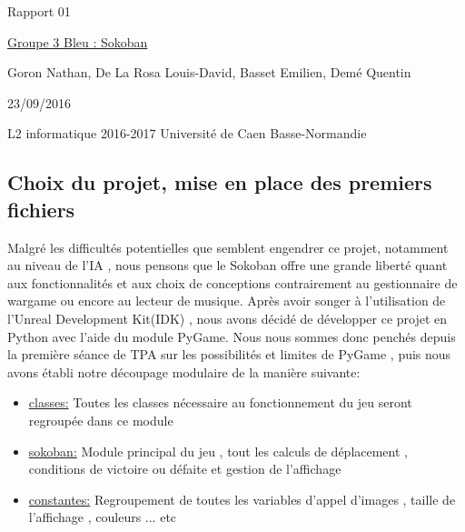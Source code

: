 \documentclass{article}
\begin{document}
\begin{titlepage}
\begin{center}
\Huge Rapport 01

\normalsize
\vspace{0.5cm}
\Large {\underline{ Groupe 3 Bleu : Sokoban} }

\vspace{1cm}
\normalsize
Goron Nathan, De La Rosa Louis-David, Basset Emilien, Demé Quentin
\newline
\newline

23/09/2016

\vspace{14cm}
L2 informatique 2016-2017 Université de Caen Basse-Normandie
\end{center}
\end{titlepage}


\newpage
\begin{center}
\section{Choix du projet, mise en place des premiers fichiers }
\end{center}
Malgré les difficultés potentielles que semblent engendrer ce projet, notamment au niveau de l'IA , nous pensons que le Sokoban offre une grande liberté quant aux fonctionnalités et aux choix de conceptions contrairement au gestionnaire de wargame ou encore au lecteur de musique.\newline
Après avoir songer à l'utilisation de l'Unreal Development Kit(IDK) , nous avons décidé de développer ce projet en Python avec l'aide du module PyGame.\newline
Nous nous sommes donc penchés depuis la première séance de TPA sur les possibilités et limites de PyGame , puis nous avons établi notre découpage modulaire de la manière suivante:
\vspace{0.3cm}
\begin{itemize}

\item \underline{classes:}
Toutes les classes nécessaire au fonctionnement du jeu seront regroupée dans ce module
\item \underline{sokoban:}
Module principal du jeu , tout les calculs de déplacement , conditions de victoire ou défaite et gestion de l'affichage 
\item \underline{constantes:}
Regroupement de toutes les variables d'appel d'images , taille de l'affichage , couleurs ... etc
\end{itemize}
\end{document}
